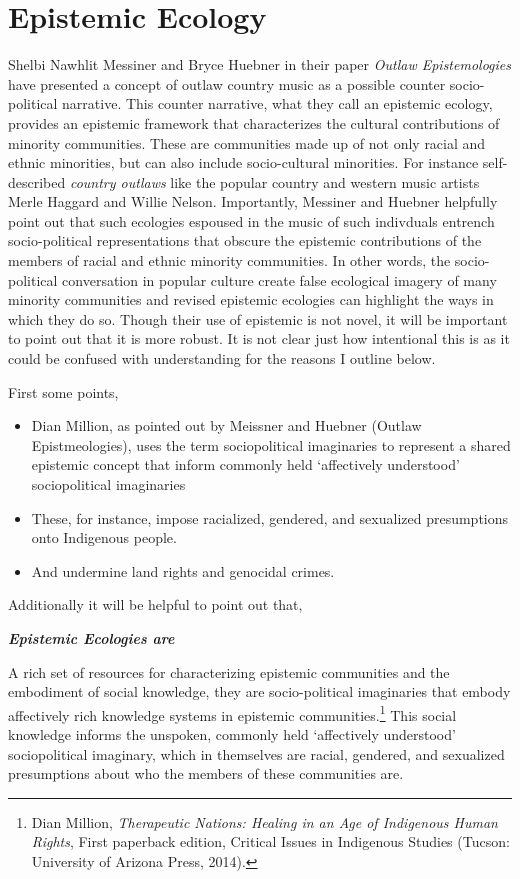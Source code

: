\documentclass[phdthesis,12pt,final]{wuthesis}
\theoremstyle{definition}
\theoremstyle{definition}
\theoremstyle{definition}
\theoremstyle{definition}
\theoremstyle{remark}
\begin{document}
\section{Epistemic Ecology}\label{epistemic-ecology}

Shelbi Nawhlit Messiner and Bryce Huebner in their paper \emph{Outlaw Epistemologies} have presented a concept of outlaw country music as a possible counter socio-political narrative. This counter narrative, what they call an epistemic ecology, provides an epistemic framework that characterizes the cultural contributions of minority communities. These are communities made up of not only racial and ethnic minorities, but can also include socio-cultural minorities. For instance self-described \emph{country outlaws} like the popular country and western music artists Merle Haggard and Willie Nelson. Importantly, Messiner and Huebner helpfully point out that such ecologies espoused in the music of such indivduals entrench socio-political representations that obscure the epistemic contributions of the members of racial and ethnic minority communities. In other words, the socio-political conversation in popular culture create false ecological imagery of many minority communities and revised epistemic ecologies can highlight the ways in which they do so. Though their use of epistemic is not novel, it will be important to point out that it is more robust. It is not clear just how intentional this is as it could be confused with understanding for the reasons I outline below.

First some points,

\begin{itemize}
\tightlist
\item
  Dian Million, as pointed out by Meissner and Huebner (Outlaw Epistmeologies), uses the term sociopolitical imaginaries to represent a shared epistemic concept that inform commonly held `affectively understood' sociopolitical imaginaries
\item
  These, for instance, impose racialized, gendered, and sexualized presumptions onto Indigenous people.
\item
  And undermine land rights and genocidal crimes.
\end{itemize}

Additionally it will be helpful to point out that,

\textbf{\emph{Epistemic Ecologies are}}

A rich set of resources for characterizing epistemic communities and the embodiment of social knowledge, they are socio-political imaginaries that embody affectively rich knowledge systems in epistemic communities.\footnote{Dian Million, \emph{Therapeutic {Nations}: {Healing} in an {Age} of {Indigenous Human Rights}}, First paperback edition, Critical {Issues} in {Indigenous Studies} (Tucson: University of Arizona Press, 2014).} This social knowledge informs the unspoken, commonly held `affectively understood' sociopolitical imaginary, which in themselves are racial, gendered, and sexualized presumptions about who the members of these communities are.
\end{document}
